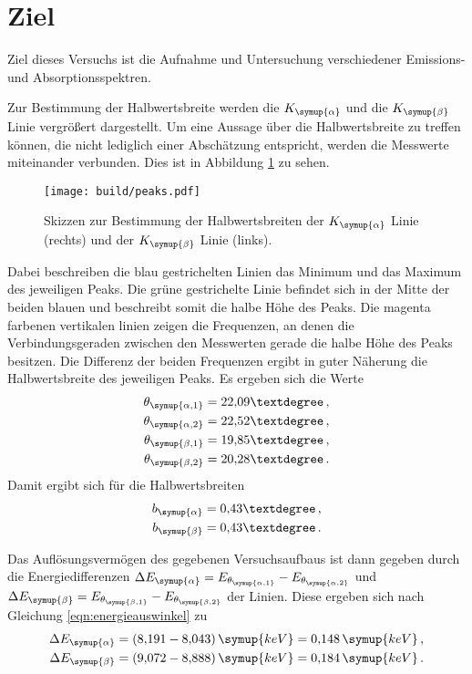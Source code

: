 \section{Ziel}
\label{sec:Ziel}

Ziel dieses Versuchs ist die Aufnahme und Untersuchung verschiedener Emissions- und
Absorptionsspektren.

Zur Bestimmung der Halbwertsbreite werden die $K_{\symup{\alpha}}$ und die
$K_{\symup{\beta}}$ Linie vergrößert dargestellt. Um eine Aussage über die
Halbwertsbreite zu treffen können, die nicht lediglich einer Abschätzung entspricht,
werden die Messwerte miteinander verbunden. Dies ist in Abbildung \ref{fig:hbreite}
zu sehen.

\begin{figure}
  \centering
  \texttt{[image: build/peaks.pdf]}
  \caption{Skizzen zur Bestimmung der Halbwertsbreiten der $K_{\symup{\alpha}}$
  Linie (rechts) und der $K_{\symup{\beta}}$ Linie (links).}
  \label{fig:hbreite}
\end{figure}

Dabei beschreiben die blau gestrichelten Linien das Minimum und das Maximum des
jeweiligen Peaks. Die grüne gestrichelte Linie befindet sich in der Mitte der
beiden blauen und beschreibt somit die halbe Höhe des Peaks. Die magenta farbenen
vertikalen linien zeigen die Frequenzen, an denen die Verbindungsgeraden zwischen
den Messwerten gerade die halbe Höhe des Peaks besitzen. Die Differenz der beiden
Frequenzen ergibt in guter Näherung die Halbwertsbreite des jeweiligen Peaks.
Es ergeben sich die Werte
\begin{align*}
  \theta_{\symup{\alpha,1}}=22{,}09° \,, \\
  \theta_{\symup{\alpha,2}}=22{,}52° \,, \\
  \theta_{\symup{\beta,1}}=19{,}85° \,, \\
  \theta_{\symup{\beta,2}}=20{,}28° \,.
\end{align*}
Damit ergibt sich für die Halbwertsbreiten
\begin{align*}
  b_{\symup{\alpha}}=0{,}43° \,,\\
  b_{\symup{\beta}}=0{,}43°  \,.
\end{align*}

Das Auflösungsvermögen des gegebenen Versuchsaufbaus ist dann gegeben durch die
Energiedifferenzen $\Delta E_{\symup{\alpha}}=E_{\theta_{\symup{\alpha,1}}}
-E_{\theta_{\symup{\alpha,2}}}$ und $\Delta E_{\symup{\beta}}=
E_{\theta_{\symup{\beta,1}}}-E_{\theta_{\symup{\beta,2}}}$ der Linien. Diese
ergeben sich nach Gleichung \eqref{eqn:energieauswinkel} zu
\begin{align*}
  \Delta E_{\symup{\alpha}}=(8{,}191-8{,}043)\,\symup{keV}=0{,}148\,\symup{keV} \,, \\
  \Delta E_{\symup{\beta}}=(9{,}072-8{,}888)\,\symup{keV}=0{,}184\,\symup{keV} \,.
\end{align*}
